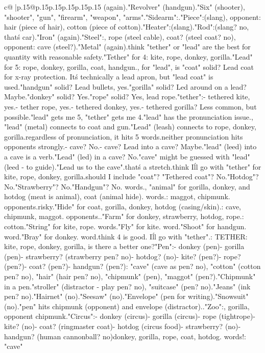 \documentclass{article}
\begin{document}
{\begin{supertabular}{c@{$\;$}|p{.15\linewidth}@{}p{.15\linewidth}p{.15\linewidth}p{.15\linewidth}p{.15\linewidth}p{.15\linewidth}}
{{{(again).\n\n"Revolver" (handgun).\n"Six" (shooter), "shooter", "gun", "firearm", "weapon", "arms".\n\n"Sidearm":\nHandgun.\n\n"Piece":\nHandgun (slang), opponent: hair (piece of hair), cotton (piece of cotton).\n\n"Heater":\nHandgun (slang).\n\n"Rod":\nHandgun (slang? no, that\'s car).\n\n"Iron" (again).\n\n"Steel":\nHandgun, rope (steel cable), coat? (steel coat? no), opponent: cave (steel?).\n\n"Metal" (again).\n\nI think "tether" or "lead" are the best for quantity with reasonable safety.\n"Tether" for 4: kite, rope, donkey, gorilla.\n"Lead" for 5: rope, donkey, gorilla, coat, handgun.\n\nActually, for "lead", is "coat" solid? Lead coat for x-ray protection. It\'s technically a lead apron, but "lead coat" is used.\nIs "handgun" solid? Lead bullets, yes.\nIs "gorilla" solid? Led around on a lead? Maybe.\nIs "donkey" solid? Yes.\nIs "rope" solid? Yes, lead rope.\n\nFor "tether":\nKite - tethered kite, yes.\nRope - tether rope, yes.\nDonkey - tethered donkey, yes.\nGorilla - tethered gorilla? Less common, but possible.\n\nSo "lead" gets me 5, "tether" gets me 4.\nBut "lead" has the pronunciation issue.\nHowever, "lead" (metal) connects to coat and gun.\n"Lead" (leash) connects to rope, donkey, gorilla.\nSo regardless of pronunciation, it hits 5 words.\nAnd neither pronunciation hits opponents strongly.\nLed - cave? No.\nLeed - cave? Lead into a cave? Maybe.\nBut "lead" (leed) into a cave is a verb.\n"Lead" (led) in a cave? No.\nSo "cave" might be guessed with "lead" (leed - to guide).\n"Lead us to the cave".\nBut that\'s a stretch.\n\nI think I\'ll go with "tether" for kite, rope, donkey, gorilla.\nOr should I include "coat"? "Tethered coat"? No.\n"Hotdog"? No.\n"Strawberry"? No.\n"Handgun"? No.\n{} words.\n\nWait, "animal" for gorilla, donkey, and hotdog (meat is animal), coat (animal hide). words.\nOpponents: maggot, chipmunk. opponents.\nToo risky.\n\n"Hide" for coat, gorilla, donkey, hotdog (casing/skin).\nOpponents: cave, chipmunk, maggot. opponents.\nWorse.\n\n"Farm" for donkey, strawberry, hotdog, rope.\nOpponent: cotton.\n\n"String" for kite, rope. words.\n\n"Fly" for kite. word.\n\n"Shoot" for handgun. word.\n\n"Bray" for donkey. word.\n\nI think 4 is good. I\'ll go with "tether".\n\nCLUE: TETHER\nTARGETS: kite, rope, donkey, gorilla\n\nWait, is there a better one?\n\n"Pen":\n- donkey (pen)\n- gorilla (pen)\n- strawberry? (strawberry pen? no)\n- hotdog? (no)\n- kite? (pen?)\n- rope? (pen?)\n- coat? (pen?)\n- handgun? (pen?)\nOpponent: "cave" (cave as pen? no), "cotton" (cotton pen? no), "hair" (hair pen? no), "chipmunk" (pen), "maggot" (pen?).\n"Chipmunk" in a pen.\nAlso "stroller" (distractor - play pen? no), "suitcase" (pen? no).\n"Jeans" (ink pen? no).\n"Hairnet" (no).\n"Seesaw" (no).\n"Envelope" (pen for writing).\n"Snowsuit" (no).\nSo "pen" hits chipmunk (opponent) and envelope (distractor).\nBad.\n\n"Zoo":\nDonkey, gorilla, opponent chipmunk.\n\n"Circus":\n- donkey (circus)\n- gorilla (circus)\n- rope (tightrope)\n- kite? (no)\n- coat? (ringmaster coat)\n- hotdog (circus food)\n- strawberry? (no)\n- handgun? (human cannonball? no)\nSo donkey, gorilla, rope, coat, hotdog. words!\nOpponents: "cave" }}}
\end{supertabular}}
\end{document}
